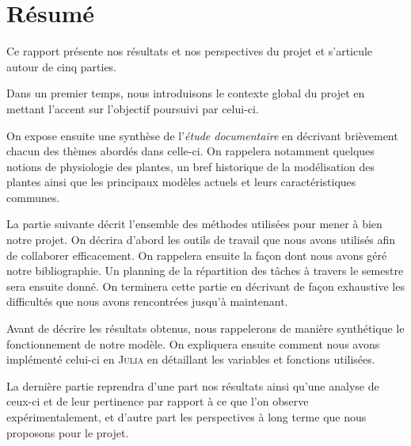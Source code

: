 \section*{Résumé}
Ce rapport présente nos résultats et nos perspectives
du projet et s'articule autour de cinq parties.

Dans un premier temps, nous introduisons le contexte global du
projet en mettant l'accent sur l'objectif poursuivi par celui-ci.

On expose ensuite une synthèse de l'\emph{étude documentaire}
en décrivant brièvement chacun des thèmes abordés dans celle-ci.
On rappelera notamment quelques notions de physiologie des plantes, un bref historique de la modélisation des plantes
ainsi que les principaux modèles actuels et leurs caractéristiques communes.

La partie suivante décrit l'ensemble des méthodes
utilisées pour mener à bien notre projet.
On décrira d'abord les outils de travail que nous avons
utilisés afin de collaborer efficacement.
On rappelera ensuite la façon dont nous avons
géré notre bibliographie.
Un planning de la répartition des tâches à travers
le semestre sera ensuite donné.
On terminera cette partie en décrivant de façon
exhaustive les difficultés que nous avons rencontrées
jusqu'à maintenant.

Avant de décrire les résultats obtenus,
nous rappelerons de manière synthétique le fonctionnement
de notre modèle.
On expliquera ensuite comment nous avons implémenté
celui-ci en \textsc{Julia} en détaillant les
variables et fonctions utilisées.

La dernière partie reprendra d'une part nos résultats
ainsi qu'une analyse de ceux-ci et de leur pertinence
par rapport à ce que l'on observe expérimentalement,
et d'autre part les perspectives à long terme
que nous proposons pour le projet.
